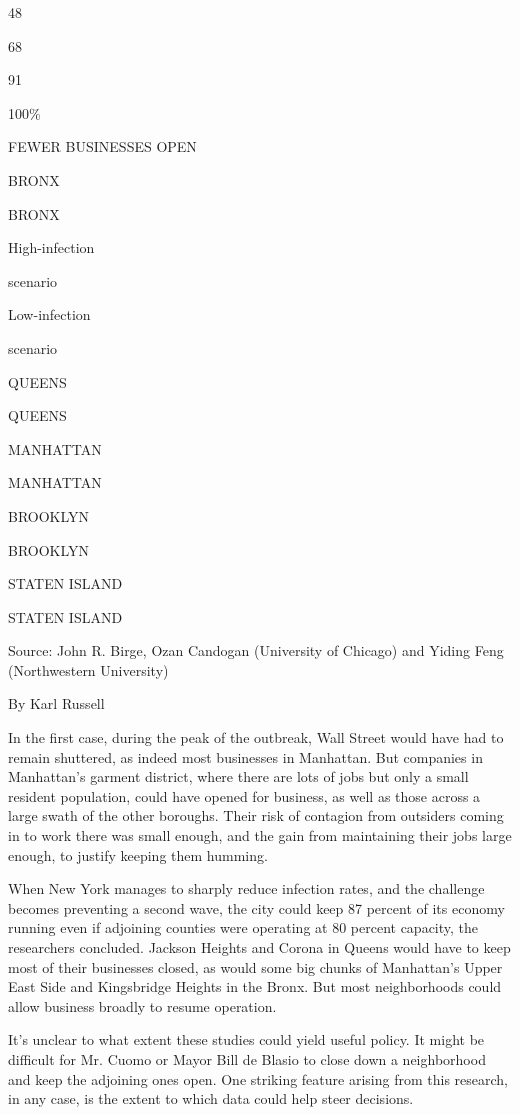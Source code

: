 48

68

91

100\%

FEWER BUSINESSES OPEN

BRONX

BRONX

High-infection

scenario

Low-infection

scenario

QUEENS

QUEENS

MANHATTAN

MANHATTAN

BROOKLYN

BROOKLYN

STATEN ISLAND

STATEN ISLAND

Source: John R. Birge, Ozan Candogan (University of Chicago) and Yiding
Feng (Northwestern University)

By Karl Russell

In the first case, during the peak of the outbreak, Wall Street would
have had to remain shuttered, as indeed most businesses in Manhattan.
But companies in Manhattan's garment district, where there are lots of
jobs but only a small resident population, could have opened for
business, as well as those across a large swath of the other boroughs.
Their risk of contagion from outsiders coming in to work there was small
enough, and the gain from maintaining their jobs large enough, to
justify keeping them humming.

When New York manages to sharply reduce infection rates, and the
challenge becomes preventing a second wave, the city could keep 87
percent of its economy running even if adjoining counties were operating
at 80 percent capacity, the researchers concluded. Jackson Heights and
Corona in Queens would have to keep most of their businesses closed, as
would some big chunks of Manhattan's Upper East Side and Kingsbridge
Heights in the Bronx. But most neighborhoods could allow business
broadly to resume operation.

It's unclear to what extent these studies could yield useful policy. It
might be difficult for Mr. Cuomo or Mayor Bill de Blasio to close down a
neighborhood and keep the adjoining ones open. One striking feature
arising from this research, in any case, is the extent to which data
could help steer decisions.

